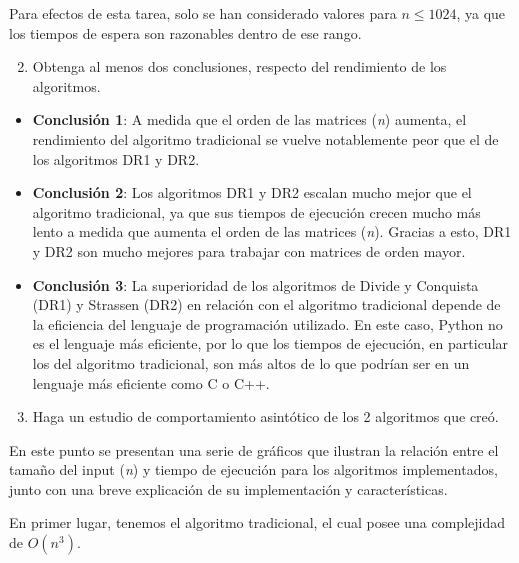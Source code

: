 \documentclass[12pt]{report}
\begin{document}
  Para efectos de esta tarea, solo se han considerado valores para $ n \leq 1024 $, ya que los tiempos de espera son razonables dentro de ese rango.
  
  \begin{enumerate}
    \setcounter{enumi}{1}
    \item Obtenga al menos dos conclusiones, respecto del rendimiento de los algoritmos.
  \end{enumerate}
  
  \begin{itemize}
    \item \textbf{Conclusión 1}: A medida que el orden de las matrices (\textit{n}) aumenta, el rendimiento del algoritmo tradicional se vuelve notablemente peor que el de los algoritmos DR1 y DR2.
    \item \textbf{Conclusión 2}: Los algoritmos DR1 y DR2 escalan mucho mejor que el algoritmo tradicional, ya que sus tiempos de ejecución crecen mucho más lento a medida que aumenta el orden de las matrices (\textit{n}). Gracias a esto, DR1 y DR2 son mucho mejores para trabajar con matrices de orden mayor.
    \item \textbf{Conclusión 3}: La superioridad de los algoritmos de Divide y Conquista (DR1) y Strassen (DR2) en relación con el algoritmo tradicional depende de la eficiencia del lenguaje de programación utilizado. En este caso, Python no es el lenguaje más eficiente, por lo que los tiempos de ejecución, en particular los del algoritmo tradicional, son más altos de lo que podrían ser en un lenguaje más eficiente como C o C++.
  \end{itemize}

  \newpage
  
  \begin{enumerate}
    \setcounter{enumi}{2}
    \item Haga un estudio de comportamiento asintótico de los 2 algoritmos que creó.
  \end{enumerate}
  
  En este punto se presentan una serie de gráficos que ilustran la relación entre el tamaño del input (\textit{n}) y tiempo de ejecución para los algoritmos implementados, junto con una breve explicación de su implementación y características.
  
  En primer lugar, tenemos el algoritmo tradicional, el cual posee una complejidad de $ O(n^3) $.
\end{document}
